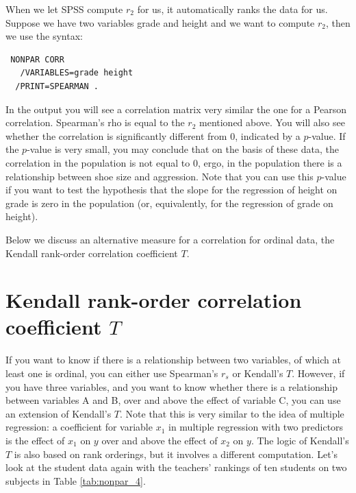 \documentclass[]{book}\usepackage[]{graphicx}\usepackage[]{color}
\begin{document}
When we let SPSS compute $r_2$ for us, it automatically ranks the data for us. Suppose we have two variables grade and height and we want to compute $r_2$, then we use the syntax:

 \begin{verbatim}
 NONPAR CORR 
   /VARIABLES=grade height 
  /PRINT=SPEARMAN .
 \end{verbatim}
  
In the output you will see a correlation matrix very similar the one for a Pearson correlation. Spearman's rho is equal to the $r_2$ mentioned above. You will also see whether the correlation is significantly different from 0, indicated by a $p$-value. If the $p$-value is very small, you may conclude that on the basis of these data, the correlation in the population is not equal to 0, ergo, in the population there is a relationship between shoe size and aggression. Note that you can use this $p$-value if you want to test the hypothesis that the slope for the regression of height on grade is zero in the population (or, equivalently, for the regression of grade on height).  
  

Below we discuss an alternative measure for a correlation for ordinal data, the Kendall rank-order correlation coefficient $T$. 


\section{Kendall rank-order correlation coefficient $T$}


If you want to know if there is a relationship between two variables, of which at least one is ordinal, you can either use Spearman's $r_s$ or Kendall's $T$. However, if you have three variables, and you want to know whether there is a relationship between variables A and B, over and above the effect of variable C, you can use an extension of Kendall's $T$. Note that this is very similar to the idea of multiple regression: a coefficient for variable $x_1$ in multiple regression with two predictors is the effect of $x_1$ on $y$ over and above the effect of $x_2$ on $y$. The logic of Kendall's $T$ is also based on rank orderings, but it involves a different computation. Let's look at the student data again with the teachers' rankings of ten students on two subjects in Table \ref{tab:nonpar_4}. 
\end{document}
